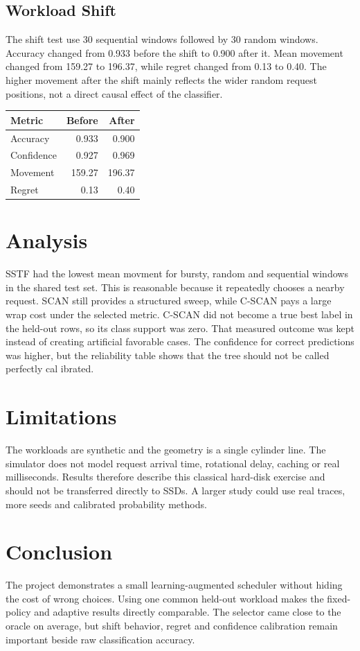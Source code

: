 \documentclass[10pt,a4paper]{article}
\begin{document}
\subsection{Workload Shift}
The shift test use 30 sequential windows followed by 30 random windows. Accuracy changed from 0.933 before the shift to 0.900 after it. Mean movement changed from 159.27 to 196.37, while regret changed from 0.13 to 0.40. The higher movement after the shift mainly reflects the wider random request positions, not a direct causal effect of the classifier.
\begin{table}[h]\centering\small
\begin{tabular}{lrr}\toprule Metric & Before & After \\\midrule
Accuracy & 0.933 & 0.900 \\
Confidence & 0.927 & 0.969 \\
Movement & 159.27 & 196.37 \\
Regret & 0.13 & 0.40 \\\bottomrule
\end{tabular}\end{table}
\newpage
\section{Analysis}
SSTF had the lowest mean movment for bursty, random and sequential windows in the shared test set. This is reasonable because it repeatedly chooses a nearby request. SCAN still provides a structured sweep, while C-SCAN pays a large wrap cost under the selected metric. C-SCAN did not become a true best label in the held-out rows, so its class support was zero. That measured outcome was kept instead of creating artificial favorable cases. The confidence for correct predictions was higher, but the reliability table shows that the tree should not be called perfectly cal ibrated.
\section{Limitations}
The workloads are synthetic and the geometry is a single cylinder line. The simulator does not model request arrival time, rotational delay, caching or real milliseconds. Results therefore describe this classical hard-disk exercise and should not be transferred directly to SSDs. A larger study could use real traces, more seeds and calibrated probability methods.
\section{Conclusion}
The project demonstrates a small learning-augmented scheduler without hiding the cost of wrong choices. Using one common held-out workload makes the fixed-policy and adaptive results directly comparable. The selector came close to the oracle on average, but shift behavior, regret and confidence calibration remain important beside raw classification accuracy.
\end{document}

